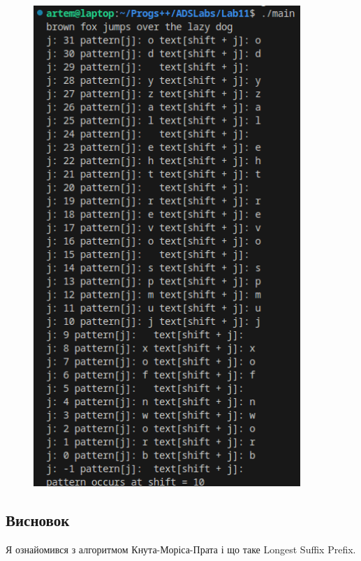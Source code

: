 \documentclass[12pt]{extarticle}
\begin{document}
\vspace{12pt}
\begin{figure}[H]
    \centering
    \includegraphics[width=0.90\textwidth]{Screenshot_20231206_085654}
    \caption{}
\end{figure}

\subsection*{Висновок} 

Я ознайомився з алгоритмом Кнута-Моріса-Прата і що таке Longest Suffix Prefix.
\end{document}
